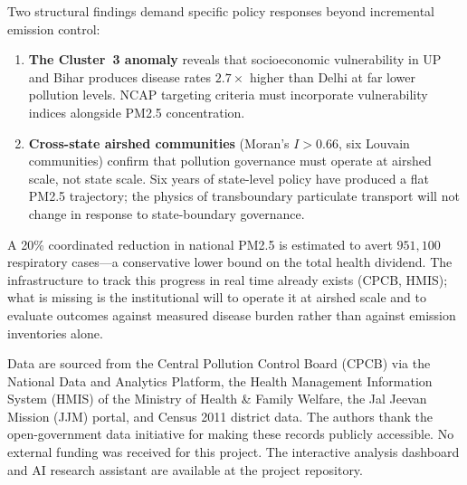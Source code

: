 \documentclass{article}
\begin{document}
Two structural findings demand specific policy responses beyond incremental emission
control:

\begin{enumerate}
  \item \textbf{The Cluster~3 anomaly} reveals that socioeconomic vulnerability in
        UP and Bihar produces disease rates $2.7\times$ higher than Delhi at far lower
        pollution levels. NCAP targeting criteria must incorporate vulnerability indices
        alongside PM2.5 concentration.
  \item \textbf{Cross-state airshed communities} (Moran's $I > 0.66$, six Louvain
        communities) confirm that pollution governance must operate at airshed scale,
        not state scale. Six years of state-level policy have produced a flat PM2.5
        trajectory; the physics of transboundary particulate transport will not change
        in response to state-boundary governance.
\end{enumerate}

A 20\% coordinated reduction in national PM2.5 is estimated to avert $951{,}100$
respiratory cases---a conservative lower bound on the total health dividend. The
infrastructure to track this progress in real time already exists (CPCB, HMIS); what is
missing is the institutional will to operate it at airshed scale and to evaluate outcomes
against measured disease burden rather than against emission inventories alone.

\begin{ack}
Data are sourced from the Central Pollution Control Board (CPCB) via the National Data
and Analytics Platform, the Health Management Information System (HMIS) of the Ministry
of Health \& Family Welfare, the Jal Jeevan Mission (JJM) portal, and Census 2011
district data. The authors thank the open-government data initiative for making these
records publicly accessible. No external funding was received for this project.
The interactive analysis dashboard and AI research assistant are available at the
project repository.
\end{ack}
\end{document}
